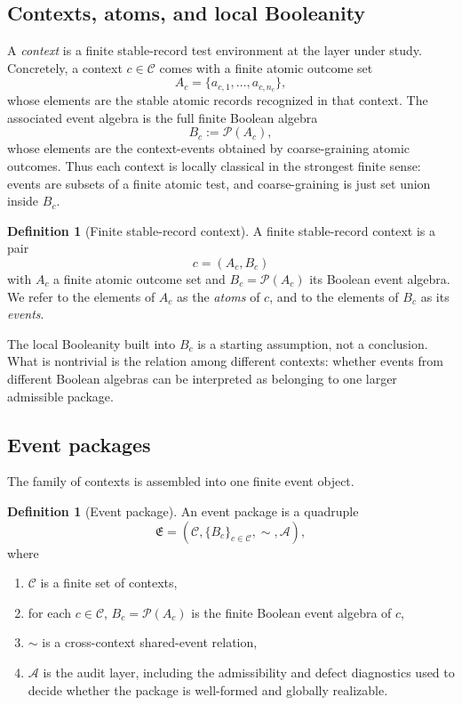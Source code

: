 \documentclass[11pt]{article}
\newcommand{\EventPackage}{\mathfrak{E}}
\theoremstyle{definition}
\newtheorem{definition}[theorem]{Definition}
\begin{document}
\subsection{Contexts, atoms, and local Booleanity}

A \emph{context} is a finite stable-record test environment at the layer under study. Concretely, a context \(c \in \mathcal C\) comes with a finite atomic outcome set
\[
A_c = \{a_{c,1},\dots,a_{c,n_c}\},
\]
whose elements are the stable atomic records recognized in that context. The associated event algebra is the full finite Boolean algebra
\[
B_c := \mathcal P(A_c),
\]
whose elements are the context-events obtained by coarse-graining atomic outcomes. Thus each context is locally classical in the strongest finite sense: events are subsets of a finite atomic test, and coarse-graining is just set union inside \(B_c\).

\begin{definition}[Finite stable-record context]
A finite stable-record context is a pair
\[
c = (A_c,B_c)
\]
with \(A_c\) a finite atomic outcome set and \(B_c=\mathcal P(A_c)\) its Boolean event algebra. We refer to the elements of \(A_c\) as the \emph{atoms} of \(c\), and to the elements of \(B_c\) as its \emph{events}.
\end{definition}

The local Booleanity built into \(B_c\) is a starting assumption, not a conclusion. What is nontrivial is the relation among different contexts: whether events from different Boolean algebras can be interpreted as belonging to one larger admissible package.

\subsection{Event packages}

The family of contexts is assembled into one finite event object.

\begin{definition}[Event package]
An event package is a quadruple
\[
\EventPackage = (\mathcal C,\{B_c\}_{c\in\mathcal C},\sim,\mathcal A),
\]
where
\begin{enumerate}
    \item \(\mathcal C\) is a finite set of contexts,
    \item for each \(c\in\mathcal C\), \(B_c=\mathcal P(A_c)\) is the finite Boolean event algebra of \(c\),
    \item \(\sim\) is a cross-context shared-event relation,
    \item \(\mathcal A\) is the audit layer, including the admissibility and defect diagnostics used to decide whether the package is well-formed and globally realizable.
\end{enumerate}
\end{definition}
\end{document}
